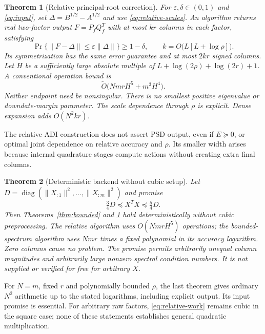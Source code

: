 \documentclass[11pt]{article}
\newtheorem{theorem}{Theorem}[section]
\numberwithin{equation}{section}
\newcommand{\diag}{\operatorname{diag}}
\begin{document}
\begin{theorem}[Relative principal-root correction]
\label{thm:relative}
For $\varepsilon,\delta\in(0,1)$ and \eqref{eq:input}, set
$\Delta=B^{1/2}-A^{1/2}$ and use \eqref{eq:relative-scales}.
An algorithm returns real two-factor output
$F=P_fQ_f^T$ with at most $kr$ columns in each factor, satisfying
\begin{equation}\label{eq:relative-error}
 \Pr\{\|F-\Delta\|\le\varepsilon\|\Delta\|\}\ge1-\delta,
 \qquad k=O\bigl(L[L+\log\rho]\bigr).
\end{equation}
Its symmetrization has the same error guarantee and at most $2kr$
signed columns. Let $H$ be a sufficiently large absolute multiple of
$L+\log(2\rho)+\log(2r)+1$. A conventional operation bound is
\begin{equation}\label{eq:relative-work}
 \widetilde O\bigl(NmrH^5+m^3H^4\bigr).
\end{equation}
Neither endpoint need be nonsingular. There is no smallest positive
eigenvalue or downdate-margin parameter. The scale dependence through
$\rho$ is explicit. Dense expansion adds $O(N^2kr)$.
\end{theorem}

The relative ADI construction does not assert PSD output, even if
$E\succeq0$, or optimal joint dependence on relative accuracy and
$\rho$. Its smaller width arises because internal quadrature stages
compute actions without creating extra final columns.

\begin{theorem}[Deterministic backend without cubic setup]
\label{thm:diagonal}
Let $D=\diag(\|X_{:1}\|^2,\ldots,\|X_{:m}\|^2)$ and promise
\begin{equation}\label{eq:diagonal-promise}
 \tfrac34D\preceq X^TX\preceq\tfrac54D.
\end{equation}
Then Theorems~\ref{thm:bounded} and \ref{thm:relative} hold
deterministically without cubic preprocessing. The relative algorithm
uses $O(NmrH^5)$ operations; the bounded-spectrum algorithm uses
$Nmr$ times a fixed polynomial in its accuracy logarithm.
Zero columns cause no problem. The promise permits arbitrarily unequal
column magnitudes and arbitrarily large nonzero spectral condition
numbers. It is not supplied or verified for free for arbitrary $X$.
\end{theorem}

For $N=m$, fixed $r$ and polynomially bounded $\rho$, the last theorem
gives ordinary $N^2$ arithmetic up to the stated logarithms, including
explicit output. Its input promise is essential. For arbitrary raw
factors, \eqref{eq:relative-work} remains cubic in the square case;
none of these statements establishes general quadratic multiplication.
\end{document}
